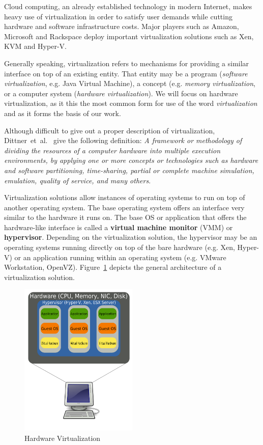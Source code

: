 Cloud computing, an already established technology in modern Internet, makes
heavy use of virtualization in order to satisfy user demands while cutting
hardware and software infrastructure costs. Major players such as Amazon,
Microsoft and Rackspace deploy important virtualization solutions such as Xen,
KVM and Hyper-V.

Generally speaking, virtualization refers to mechanisms for providing a
similar interface on top of an existing entity. That entity may be a program
(\textit{software virtualization}, e.g. {Java Virtual Machine}),
a concept (e.g. \textit{memory virtualization}, or a computer system
(\textit{hardware virtualization}). We will focus on hardware virtualization,
as it this the most common form for use of the word \textit{virtualization}
and as it forms the basis of our work.

Although difficult to give out a proper description of virtualization, Dittner~et~al.~\cite{best-damn-virt} give the following definition: \textit{A framework
or methodology of dividing the resources of a computer hardware into multiple
execution environments, by applying one or more concepts or technologies such
as hardware and software partitioning, time-sharing, partial or complete
machine simulation, emulation, quality of service, and many others}.

Virtualization solutions allow instances of operating systems to run on top of
another operating system. The base operating system offers an interface very
similar to the hardware it runs on. The base OS or application that offers the
hardware-like interface is called a \textbf{virtual machine monitor} (VMM) or
\textbf{hypervisor}. Depending on the virtualization solution, the hypervisor
may be an operating systems running directly on top of the bare hardware (e.g.
Xen, Hyper-V) or an application running within an operating system (e.g.
VMware Workstation, OpenVZ).
Figure~\ref{fig:virt-infra:hardware-virtualization} depicts the general
architecture of a virtualization solution.

\begin{figure}
  \centering
  \includegraphics[width=0.5\textwidth]{src/img/virt-infra/hardware-virtualization}
  \caption{Hardware Virtualization}
  \label{fig:virt-infra:hardware-virtualization}
\end{figure}

